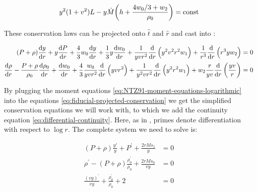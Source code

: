 \documentclass[main.tex]{subfiles}
\begin{document}
\begin{equation}
    y^2 (1+v^2) L - y \dot{M} \qty(h + \frac{4w_0/3 + w_2}{\rho_0}) = \const
\end{equation}


\begin{claim}

These conservation laws can be projected onto \(\hat{t}\) and \(\hat{r}\) and cast into \cite[eq. A7]{NobiliTurollaZampieri:1991dec}:

\begin{subequations} \label{eq:fiducial-projected-conservation}
\begin{align}
    (P+\rho) \dv{y}{r}
    +y \dv{P}{r}
    +\frac{4}{3} w_{0} \dv{y}{r}
    +\frac{1}{3} y \dv{w_0}{r}
    +\frac{1}{y v r^{2}} \dv{}{r}\left(y^{2} v^{2} r^{2} w_{1}\right)
    +\frac{1}{r^{3}} \dv{}{r}\left(r^{3} y w_{2}\right) &=0 \\
    \dv{\rho}{r}
    -\frac{P+\rho}{\rho_{0}}
    \dv{\rho_{0}}{r}
    +\dv{w_0}{r}
    +\frac{4}{3} \frac{w_{0}}{y v r^{2}} \dv{}{r}\left(y v r^{2}\right)
    +\frac{1}{y^{2} v r^{2}} \dv{}{r}\left(y^{2} r^{2} w_{1}\right)
    +w_{2} \frac{r}{y v} \dv{}{r}\left(\frac{y v}{r}\right) &=0
\end{align}
\end{subequations}
\end{claim}

By plugging the moment equations \eqref{eq:NTZ91-moment-equations-logarithmic} into the equations \eqref{eq:fiducial-projected-conservation} we get the simplified conservation equations we will work with, to which we add the continuity equation \eqref{eq:differential-continuity}. Here, as in \cite[]{NobiliTurollaZampieri:1991dec}, primes denote differentiation with respect to \(\log r\). The complete system we need to solve is:

\begin{subequations}
\begin{align}
  (P + \rho) \frac{y'}{y} + P^\prime + \frac{2rM s_1}{y}  &= 0  \\
  \rho^\prime - (P + \rho) \frac{\rho_0^\prime}{\rho_0} + \frac{2rM s_0}{vy}   &=0  \\
  \frac{(vy)^\prime}{vy} + \frac{\rho_0 ^\prime}{\rho_0} + 2 &=0
\end{align}
\end{subequations}
\end{document}
